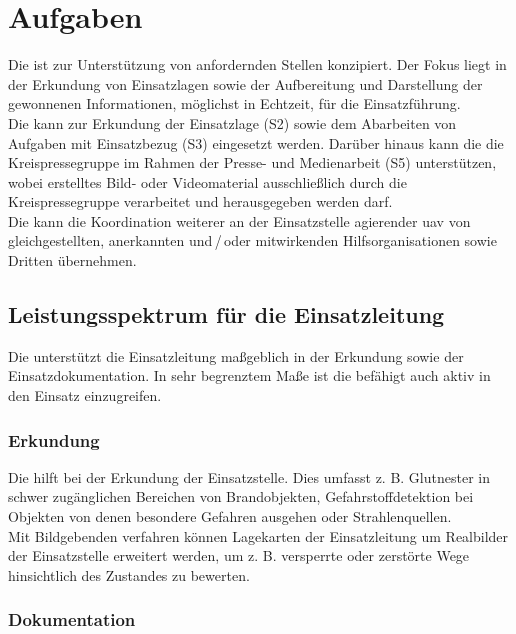 \section{Aufgaben}

Die \callee{} ist zur Unterstützung von anfordernden Stellen konzipiert. Der Fokus liegt in der Erkundung von Einsatzlagen sowie der Aufbereitung und Darstellung der gewonnenen Informationen, möglichst in Echtzeit, für die Einsatzführung.\\

\noindent Die \callee{} kann zur Erkundung der Einsatzlage (S2) sowie dem Abarbeiten von Aufgaben mit Einsatzbezug (S3) eingesetzt werden. Darüber hinaus kann die \callee{} die Kreispressegruppe im Rahmen der Presse- und Medienarbeit (S5) unterstützen, wobei erstelltes Bild- oder Videomaterial ausschließlich durch die Kreispressegruppe verarbeitet und herausgegeben werden darf.\\

\noindent Die \callee{} kann die Koordination weiterer an der Einsatzstelle agierender \ac{uav} von gleichgestellten, anerkannten und\,/\,oder mitwirkenden Hilfsorganisationen sowie Dritten übernehmen.

\subsection{Leistungsspektrum für die Einsatzleitung}

Die \callee{} unterstützt die Einsatzleitung maßgeblich in der Erkundung sowie der Einsatzdokumentation. In sehr begrenztem Maße ist die \callee{} befähigt auch aktiv in den Einsatz einzugreifen.

\subsubsection{Erkundung}

Die \callee{} hilft bei der Erkundung der Einsatzstelle. Dies umfasst z. B. Glutnester in schwer zugänglichen Bereichen von Brandobjekten, Gefahrstoffdetektion bei Objekten von denen besondere Gefahren ausgehen oder Strahlenquellen.\\

\noindent Mit Bildgebenden verfahren können Lagekarten der Einsatzleitung um Realbilder der Einsatzstelle erweitert werden, um z. B. versperrte oder zerstörte Wege hinsichtlich des Zustandes zu bewerten.

\subsubsection{Dokumentation}

